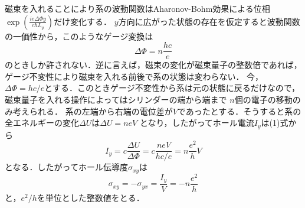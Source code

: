\documentclass[]{jsarticle}
\begin{document}
\begin{comment}
次に具体的にハミルトニアンを見てみる．ランダウゲージ$\bm{A} = (0,B_0x,0)$を採用すれば，磁束を入れる前の系のハミルトニアンは
\begin{equation}
    H = \frac{1}{2m}\left\{p_x^2 + \left(p_y - \frac{eB_0x}{c} \right)^2 \right \},
\end{equation}
である．ハミルトニアンが$y$を含まないため$[H,p_y] = 0$であり，$p_y$の固有値を$\hbar k_y$とすれば
\begin{equation}
    H = \frac{1}{2m} p_x^2  + \frac{m}{2} \omega^2 \left(x - \frac{c \hbar k_y}{eB_0} \right)^2,
\end{equation}
$\omega = eB_0/mc$は振動数,$x_0 = c\hbar k_y /eB_0$は振動中心である．これは調和振動子のハミルトニアンであり，したがって系のエネルギー準位は
\begin{equation}
    E_n = \hbar \omega \left(n + \frac{1}{2} \right),
\end{equation}
と離散的に量子化されたランダウ準位となる．


磁束が入った後もゲージ不変性によりハミルトニアン自体は不変であり，エネルギー分散も変化しない．しかし，元の系の波動関数を$e^{ik_y y}\phi_n$とすれば，
磁束を入れることにより波動関数は$e^{ik_y y} \phi_n \to e^{i(k_y + eA_y /\hbar c)y} \phi_n $ と変化するため，磁束が入ると振動中心が
$\displaystyle x_0 \to x_0 + \frac{A_y}{B_0} $だけズレる．すなわち，系の電子が$x$方向に移動する．
\end{comment}
磁束を入れることにより系の波動関数はAharonov-Bohm効果による位相$\displaystyle \exp{ \left(\frac{ie \Delta \Phi y}{c\hbar L_y} \right)}$だけ変化する．
$y$方向に広がった状態の存在を仮定すると波動関数の一価性から，このようなゲージ変換は
\begin{equation}
    \Delta \Phi = n \frac{hc}{e}
\end{equation}
のときしか許されない．逆に言えば，磁束の変化が磁束量子の整数倍であれば，ゲージ不変性により磁束を入れる前後で系の状態は変わらない．
今，$\Delta \Phi = hc/e$とする．このときゲージ不変性から系は元の状態に戻るだけなので，磁束量子を入れる操作によってはシリンダーの端から端まで
$n$個の電子の移動のみ考えられる．
系の左端から右端の電位差が$V$であったとする．そうすると系の全エネルギーの変化$\Delta U$は$\Delta U = neV$
となり，したがってホール電流$I_y$は(1)式から
\begin{equation}
    I_y = c\frac{\Delta U}{\Delta \Phi} = c\frac{neV}{hc/e} = n \frac{e^2}{h} V
\end{equation}
となる．したがってホール伝導度$\sigma_{xy}$は
\begin{equation}
    \sigma_{xy} = -\sigma_{yx} = \frac{I_y}{V} = -n\frac{e^2}{h}
\end{equation}
と，$e^2/h$を単位とした整数値をとる．

\end{document}
